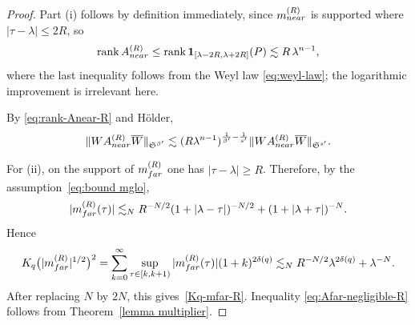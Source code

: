 \documentclass[10pt,a4paper]{amsart}
\begin{document}
\begin{proof}
  Part (i) follows by definition immediately, since \(m_{\rm near}^{(R)}\) is supported where
  \(|\tau-\lambda|\leq 2R\), so
  \[
    \operatorname{rank}A_{\rm near}^{(R)}
    \leq
    \operatorname{rank}\mathbf{1}_{[\lambda-2R,\lambda+2R]}(P)
    \lesssim R\,\lambda^{n-1},
  \]
  where the last inequality follows from the Weyl law \eqref{eq:weyl-law}; the logarithmic improvement is irrelevant here.

  By \eqref{eq:rank-Anear-R} and H\"older,
  \[
    \|WA_{\rm near}^{(R)}\overline{W}\|_{\mathfrak{S}^{\beta'}}
    \lesssim
    (R\lambda^{n-1})^{\frac1{\beta'}-\frac1{s'}}
    \|WA_{\rm near}^{(R)}\overline{W}\|_{\mathfrak{S}^{s'}}.
  \]

  For (ii), on the support of \(m_{\rm far}^{(R)}\) one has \(|\tau-\lambda|\geq R\). Therefore, by the assumption~\eqref{eq:bound mglo},
  \[
    |m_{\rm far}^{(R)}(\tau)|
    \lesssim_N    R^{-N/2}(1+|\lambda-\tau|)^{-N/2}+(1+|\lambda+\tau|)^{-N}.
  \]
  Hence
  \begin{align*}
    K_q\big(|m_{\rm far}^{(R)}|^{1/2}\big)^2
    =
    \sum_{k=0}^\infty
    \sup_{\tau\in[k,k+1)}|m_{\rm far}^{(R)}(\tau)|
    (1+k)^{2\delta(q)} 
    \lesssim_N
    R^{-N/2}\lambda^{2\delta(q)}+\lambda^{-N}.
  \end{align*}
  After replacing \(N\) by \(2N\), this gives~\eqref{Kq-mfar-R}. Inequality \eqref{eq:Afar-negligible-R} follows from Theorem~\ref{lemma multiplier}.
\end{proof}
\end{document}
